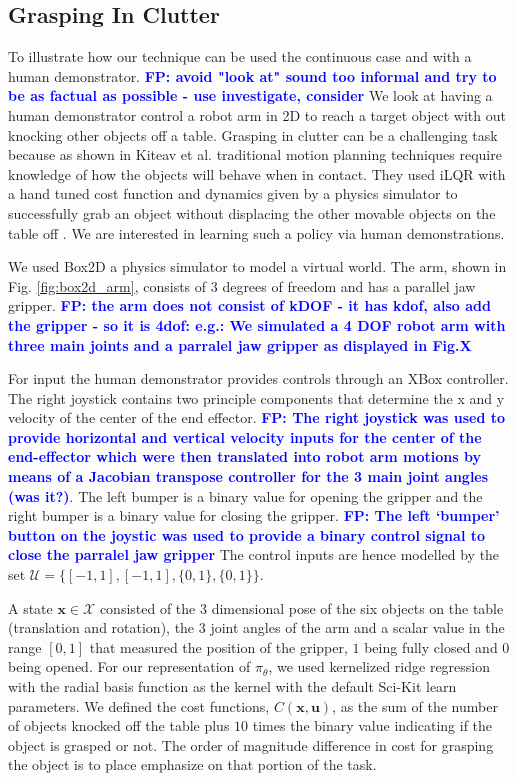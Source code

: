 \documentclass[10pt, conference]{ieeeconf}      %
\newcommand{\bu}{\mathbf{u}}
\newcommand{\bx}{\mathbf{x}}
\newcommand{\fpnote}[1]{\ifthenelse{\boolean{include-notes}}%
 {\textcolor{blue}{\textbf{FP: #1}}}{}}
\begin{document}
\subsection{Grasping In Clutter}
To illustrate how our technique can be used the continuous case and with a human demonstrator. 
\fpnote{avoid "look at" sound too informal and try to be as factual as possible - use investigate, consider}
We look at having a human demonstrator control a robot arm in 2D to reach a target object with out knocking other objects off a table. Grasping in clutter can be a challenging task because as shown in Kiteav et al. traditional motion planning techniques require knowledge of how the objects will behave when in contact. They used iLQR with a hand tuned cost function and dynamics given by a physics simulator to successfully grab an object without displacing the other movable objects on the table off \cite{kitaevphysics}. We are interested in learning such a policy via human demonstrations.   

We used Box2D a physics simulator to model a virtual world. The arm, shown in Fig. \ref{fig:box2d_arm}, consists of 3
degrees of freedom and has a parallel jaw gripper. \fpnote{the arm does not consist of kDOF - it has kdof, also add the
    gripper - so it is 4dof: e.g.: We simulated a 4 DOF robot arm with three main joints and a parralel jaw gripper as
displayed in Fig.X}

For input the human demonstrator provides controls through an XBox controller. The right joystick contains two principle
components that determine the x and y velocity of the center of the end effector. \fpnote{The right joystick was used to
    provide horizontal and vertical velocity inputs for the center of the end-effector which were then translated into
robot arm motions by means of a Jacobian transpose controller for the 3 main joint angles (was it?)}. The left bumper is a binary value for opening the gripper and the right bumper is a binary value for closing the gripper. 
\fpnote{The left `bumper' button on the joystic was used to provide a binary control signal to close the parralel jaw
gripper} The control inputs are hence modelled by the set $\mathcal{U} = \lbrace [-1,1],[-1,1],\lbrace 0,1 \rbrace, \lbrace 0, 1\rbrace \rbrace$.  

A state $\bx\in \mathcal{X}$ consisted of the 3 dimensional pose of the six objects on the table (translation and rotation), the 3 joint angles of the arm and a scalar value in the range $[0,1]$ that measured the position of the gripper, $1$ being fully closed and $0$ being opened. For our representation of $\pi_{\theta}$, we used kernelized ridge regression with the radial basis function as the kernel with the default Sci-Kit learn parameters. We defined the cost functions, $C(\bx,\bu)$, as the sum of the number of objects knocked off the table plus $10$ times the binary value indicating if the object is grasped or not. The order of magnitude difference in cost for grasping the object is to place emphasize on that portion of the task.  
\end{document}

